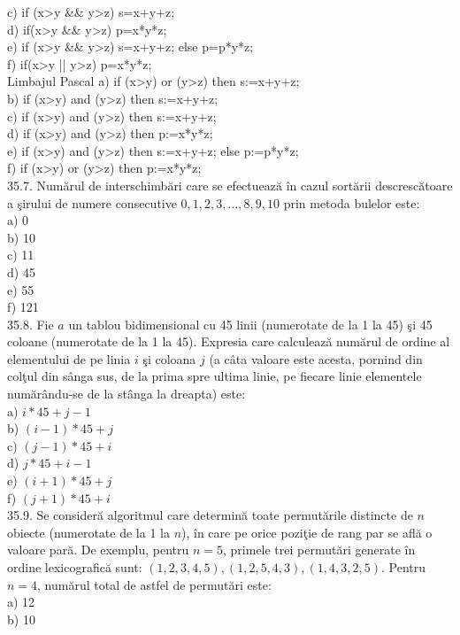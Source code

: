 \begin{itemize}
\begin{enumerate}
c) if (x>y \&\& y>z) s=x+y+z;
\\
d) if(x>y \&\& y>z) p=x*y*z;
\\
e) if (x>y \&\& y>z) s=x+y+z;
    else p=p*y*z;
\\
f) if(x>y || y>z) p=x*y*z;
\\
Limbajul Pascal
a) if (x>y) or (y>z) then s:=x+y+z;
\\
b) if (x>y) and (y>z) then s:=x+y+z;
\\
c) if (x>y) and (y>z) then s:=x+y+z;
\\
d) if (x>y) and (y>z) then p:=x*y*z;
\\
e) if (x>y) and (y>z) then s:=x+y+z;
    else p:=p*y*z;
\\
f) if (x>y) or (y>z) then p:=x*y*z;
\\
35.7. Numărul de interschimbări care se efectuează în cazul sortării descrescătoare a şirului de numere consecutive $0,1,2,3, \ldots, 8,9,10$ prin metoda bulelor este:
\\
a) 0
\\
b) 10
\\
c) 11
\\
d) 45
\\
e) 55
\\
f) 121
\\
35.8. Fie $a$ un tablou bidimensional cu 45 linii (numerotate de la 1 la 45) şi 45 coloane (numerotate de la 1 la 45). Expresia care calculează numărul de ordine al elementului de pe linia $i$ şi coloana $j$ (a câta valoare este acesta, pornind din colţul din sânga sus, de la prima spre ultima linie, pe fiecare linie elementele numărându-se de la stânga la dreapta) este:
\\
a) $i * 45+j-1$
\\
b) $(i-1) * 45+j$
\\
c) $(j-1) * 45+i$
\\
d) $j * 45+i-1$
\\
e) $(i+1) * 45+j$
\\
f) $(j+1) * 45+i$
\\
35.9. Se consideră algoritmul care determină toate permutările distincte de $n$ obiecte (numerotate de la 1 la $n$), în care pe orice poziţie de rang par se află o valoare pară. De exemplu, pentru $n=5$, primele trei permutări generate în ordine lexicografică sunt: $(1,2,3,4,5),(1,2,5,4,3),(1,4,3,2,5)$.
Pentru $n=4$, numărul total de astfel de permutări este:
\\
a) 12
\\
b) 10
\\

\end{enumerate}
\end{itemize}
